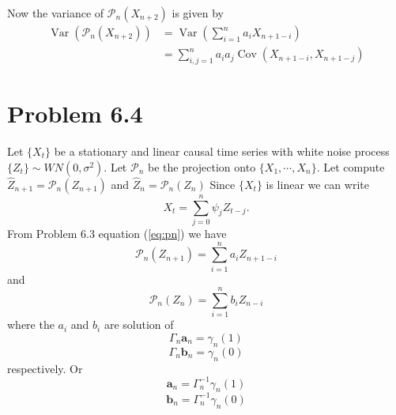 \documentclass[11pt, oneside]{article}   	%
\newcommand{\Var}{\operatorname{Var}}
\newcommand{\Cov}{\operatorname{Cov}}
\begin{document}
 Now the variance of $\mathcal{P}_{n}(X_{n+2})$ is given by 
 \begin{equation}
 \begin{split}
 \Var(\mathcal{P}_{n}(X_{n+2})) &= \Var\left(   \sum_{i=1}^{n}a_{i}X_{n+1-i}   \right)\\
 &=\sum_{i,j=1}^{n}a_{i}a_{j}\Cov(X_{n+1-i},X_{n+1-j})
 \end{split}
 \end{equation}
 
 
 
 \section{Problem 6.4}
 Let $\{ X_{t} \}$ be a stationary and linear causal time series with white noise process $\{ Z_{t} \} \sim WN(0,\sigma^{2})$. Let $\mathcal{P}_{n}$ be the projection onto $\{ X_{1},\cdots,X_{n} \}$.
 Let compute $\widehat{Z}_{n+1} = \mathcal{P}_{n}(Z_{n+1})$ and  $\widehat{Z}_{n} = \mathcal{P}_{n}(Z_{n})$
 Since $\{ X_{t} \}$ is linear we can write 
 \begin{equation}
 X_{t} = \sum_{j=0}^{n}\psi_{j}Z_{t-j}.
 \end{equation}
 From Problem 6.3  equation (\ref{eq:pn}) we have 
 \begin{equation}\label{eq:pn1}
\mathcal{P}_{n}(Z_{n+1}) = \sum_{i=1}^{n}a_{i}Z_{n+1-i}
\end{equation} 
and 
 \begin{equation}\label{eq:pn2}
\mathcal{P}_{n}(Z_{n}) = \sum_{i=1}^{n}b_{i}Z_{n-i}
\end{equation} 
where the  $a_{i}$ and $b_{i}$ are solution of 
 \begin{equation}
 \Gamma_{n}\textbf{a}_{n} = \gamma_{n}(1)
 \end{equation}
  \begin{equation}
 \Gamma_{n}\textbf{b}_{n} = \gamma_{n}(0)
 \end{equation}
respectively. Or 
  \begin{equation}
\textbf{a}_{n} = \Gamma_{n}^{-1} \gamma_{n}(1)
 \end{equation}
  \begin{equation}
\textbf{b}_{n} =  \Gamma_{n}^{-1}\gamma_{n}(0)
 \end{equation}
\end{document}
